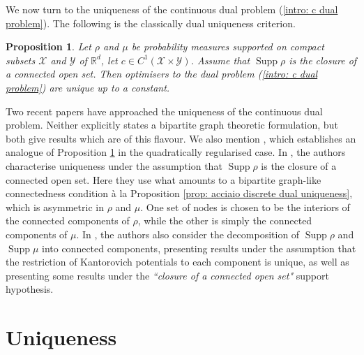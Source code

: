 \documentclass[11pt, oneside, titlepage]{book}
\theoremstyle{plain}
\newtheorem{proposition}[theorem]{Proposition}
\theoremstyle{definition}
\newcommand{\R}{\mathbb{R}}
\newcommand{\X}{\mathcal{X}}
\newcommand{\Y}{\mathcal{Y}}
\DeclareMathOperator{\supp}{Supp}
\begin{document}
We now turn to the uniqueness of the continuous dual problem (\ref{intro: c dual problem}). The following is the classically dual uniqueness criterion.
\begin{proposition}\textnormal{\cite[Proposition 7.18]{santambrogio2015optimal}}
\label{prop: int closure uniqueness santamb}
    Let $\rho$ and $\mu$ be probability measures supported on compact subsets $\X$ and $\Y$ of $\R^d$, let $c \in C^1(\X \times \Y)$. Assume that $\supp \rho$ is the closure of a connected open set. Then optimisers to the dual problem (\ref{intro: c dual problem}) are unique up to a constant.
\end{proposition}
Two recent papers \cite{staudt2025uniqueness, yang2023optimal} have approached the uniqueness of the continuous dual problem. Neither explicitly states a bipartite graph theoretic formulation, but both give results which are of this flavour. We also mention \cite{nutz2025quadratically}, which establishes an analogue of Proposition \ref{prop: int closure uniqueness santamb} in the quadratically regularised case. In \cite[Theorem 4.5]{yang2023optimal}, the authors characterise uniqueness under the assumption that $\supp \rho$ is the closure of a connected open set. Here they use what amounts to a bipartite graph-like connectedness condition à la Proposition \ref{prop: acciaio discrete dual uniqueness}, which is asymmetric in $\rho$ and $\mu$. One set of nodes is chosen to be the interiors of the connected components of $\rho$, while the other is simply the connected components of $\mu$. In \cite{staudt2025uniqueness}, the authors also consider the decomposition of $\supp \rho$ and $\supp \mu$ into connected components, presenting results under the assumption that the restriction of Kantorovich potentials to each component is unique, as well as presenting some results under the \textit{``closure of a connected open set"} support hypothesis.




\section{Uniqueness}
\end{document}
